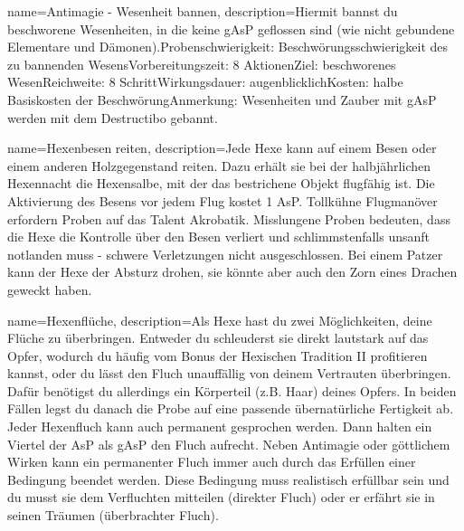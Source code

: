 {
    name={Antimagie - Wesenheit bannen},
    description={Hiermit bannst du beschworene Wesenheiten, in die keine gAsP geflossen sind (wie nicht gebundene Elementare und Dämonen).\newline Probenschwierigkeit: Beschwörungsschwierigkeit des zu bannenden Wesens\newline Vorbereitungszeit: 8 Aktionen\newline Ziel: beschworenes Wesen\newline Reichweite: 8 Schritt\newline Wirkungsdauer: augenblicklich\newline Kosten: halbe Basiskosten der Beschwörung\newline Anmerkung: Wesenheiten und Zauber mit gAsP werden mit dem Destructibo gebannt.}
}


{
    name={Hexenbesen reiten},
    description={Jede Hexe kann auf einem Besen oder einem anderen Holzgegenstand reiten. Dazu erhält sie bei der halbjährlichen Hexennacht die Hexensalbe, mit der das bestrichene Objekt flugfähig ist. Die Aktivierung des Besens vor jedem Flug kostet 1 AsP. Tollkühne Flugmanöver erfordern Proben auf das Talent Akrobatik. Misslungene Proben bedeuten, dass die Hexe die Kontrolle über den Besen verliert und schlimmstenfalls unsanft notlanden muss - schwere Verletzungen nicht ausgeschlossen. Bei einem Patzer kann der Hexe der Absturz drohen, sie könnte aber auch den Zorn eines Drachen geweckt haben.}
}


{
    name={Hexenflüche},
    description={Als Hexe hast du zwei Möglichkeiten, deine Flüche zu überbringen. Entweder du schleuderst sie direkt lautstark auf das Opfer, wodurch du häufig vom Bonus der Hexischen Tradition II profitieren kannst, oder du lässt den Fluch unauffällig von deinem Vertrauten überbringen. Dafür benötigst du allerdings ein Körperteil (z.B. Haar) deines Opfers. In beiden Fällen legst du danach die Probe auf eine passende übernatürliche Fertigkeit ab. Jeder Hexenfluch kann auch permanent gesprochen werden. Dann halten ein Viertel der AsP als gAsP den Fluch aufrecht. Neben Antimagie oder göttlichem Wirken kann ein permanenter Fluch immer auch durch das Erfüllen einer Bedingung beendet werden. Diese Bedingung muss realistisch erfüllbar sein und du musst sie dem Verfluchten mitteilen (direkter Fluch) oder er erfährt sie in seinen Träumen (überbrachter Fluch).}
}



